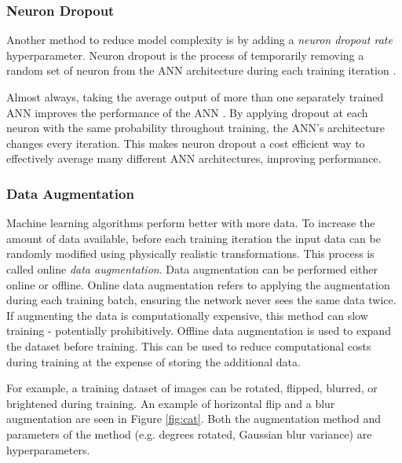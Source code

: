 \subsubsection{Neuron Dropout}

Another method to reduce model complexity is by adding a \textit{neuron dropout rate} hyperparameter. Neuron dropout is the process of temporarily removing a random set of neuron from the ANN architecture during each training iteration \cite{Srivastava2014}.

Almost always, taking the average output of more than one separately trained ANN improves the performance of the ANN \cite{Srivastava2014}. By applying dropout at each neuron with the same probability throughout training, the ANN's architecture changes every iteration. This makes neuron dropout a cost efficient way to effectively average many different ANN architectures, improving performance. 




\subsubsection{Data Augmentation}

Machine learning algorithms perform better with more data. To increase the amount of data available, before each training iteration the input data can be randomly modified using physically realistic transformations. This process is called online \textit{data augmentation}. Data augmentation can be performed either online or offline. Online data augmentation refers to applying the augmentation during each training batch, ensuring the network never sees the same data twice. If augmenting the data is computationally expensive, this method can slow training - potentially prohibitively. Offline data augmentation is used to expand the dataset before training. This can be used to reduce computational costs during training at the expense of storing the additional data.

For example, a training dataset of images can be rotated, flipped, blurred, or brightened during training. An example of horizontal flip and a blur augmentation are seen in Figure \ref{fig:cat}. Both the augmentation method and parameters of the method (e.g. degrees rotated, Gaussian blur variance) are hyperparameters.



